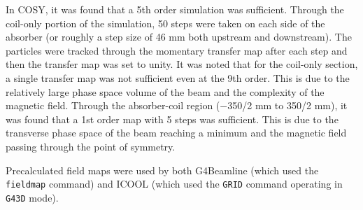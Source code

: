 \documentclass{jacow}
\begin{document}
In COSY, it was found that a 5th order simulation was sufficient. Through the coil-only portion of the simulation, 50 steps were taken on each side of the absorber (or roughly a step size of 46 mm both upstream and downstream). The particles were tracked through the momentary transfer map after each step and then the transfer map was set to unity. It was noted that for the coil-only section, a single transfer map was not sufficient even at the 9th order. This is due to the relatively large phase space volume of the beam and the complexity of the magnetic field. Through the absorber-coil region ($-$350/2 mm to 350/2 mm), it was found that a 1st order map with 5 steps was sufficient. This is due to the transverse phase space of the beam reaching a minimum and the magnetic field passing through the point of symmetry.


Precalculated field maps were used by both G4Beamline (which used the \texttt{fieldmap} command) and ICOOL (which used the \texttt{GRID} command operating in \texttt{G43D} mode).
\end{document}
